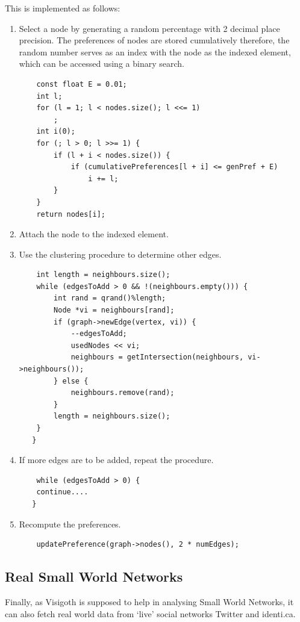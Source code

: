 \documentclass[a4paper,11pt,titlepage]{article}
\begin{document}
This is implemented as follows:
\begin{enumerate}
\item Select a node by generating a random percentage with 2 decimal place
precision.
The preferences of nodes are stored cumulatively therefore, the random number
serves as an index with the node as the indexed element, which can be accessed
using a binary search.
\begin{lstlisting}
    const float E = 0.01;
    int l;
    for (l = 1; l < nodes.size(); l <<= 1)
        ;
    int i(0);
    for (; l > 0; l >>= 1) {
        if (l + i < nodes.size()) {
            if (cumulativePreferences[l + i] <= genPref + E)
                i += l;
        }
    }
    return nodes[i];
\end{lstlisting}
   \item Attach the node to the indexed element.
   \item Use the clustering procedure to determine other edges.
\begin{lstlisting}
    int length = neighbours.size();
    while (edgesToAdd > 0 && !(neighbours.empty())) {
        int rand = qrand()%length;
        Node *vi = neighbours[rand];
        if (graph->newEdge(vertex, vi)) {
            --edgesToAdd;
            usedNodes << vi;
            neighbours = getIntersection(neighbours, vi->neighbours());
        } else {
            neighbours.remove(rand);
        }
        length = neighbours.size();
    }
   }
\end{lstlisting}
   \item If more edges are to be added, repeat the procedure.
\begin{lstlisting}
    while (edgesToAdd > 0) {
	continue....
   }
\end{lstlisting}
   \item Recompute the preferences.
\begin{lstlisting}
	updatePreference(graph->nodes(), 2 * numEdges);
\end{lstlisting}

\end{enumerate}


\subsection{Real Small World Networks}
Finally, as Visigoth is supposed to help in analysing Small World
Networks, it can also fetch real world data from `live' social
networks Twitter and identi.ca.
\end{document}
